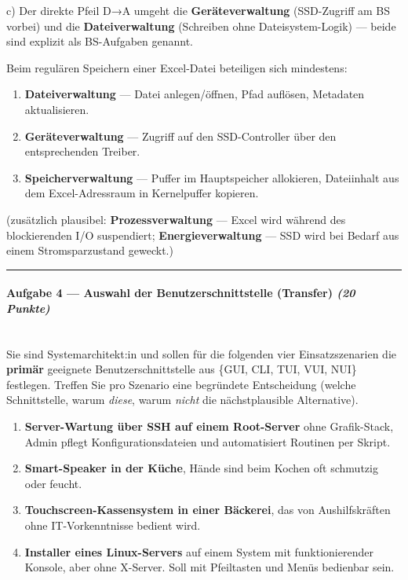 \documentclass[11pt, a4paper]{article}
\begin{document}
c) Der direkte Pfeil D→A umgeht die \textbf{Geräteverwaltung} (SSD-Zugriff am BS vorbei) und die \textbf{Dateiverwaltung} (Schreiben ohne Dateisystem-Logik) — beide sind explizit als BS-Aufgaben genannt.

Beim regulären Speichern einer Excel-Datei beteiligen sich mindestens:

\begin{enumerate}
  \item \textbf{Dateiverwaltung} — Datei anlegen/öffnen, Pfad auflösen, Metadaten aktualisieren.
  \item \textbf{Geräteverwaltung} — Zugriff auf den SSD-Controller über den entsprechenden Treiber.
  \item \textbf{Speicherverwaltung} — Puffer im Hauptspeicher allokieren, Dateiinhalt aus dem Excel-Adressraum in Kernelpuffer kopieren.
\end{enumerate}
(zusätzlich plausibel: \textbf{Prozessverwaltung} — Excel wird während des blockierenden I/O suspendiert; \textbf{Energieverwaltung} — SSD wird bei Bedarf aus einem Stromsparzustand geweckt.)



\noindent\textcolor{rulegray}{\rule{\linewidth}{0.4pt}}


\paragraph{Aufgabe 4 — Auswahl der Benutzerschnittstelle (Transfer) \textit{(20 Punkte)}}\mbox{}\\[2pt]

Sie sind Systemarchitekt:in und sollen für die folgenden vier Einsatzszenarien die \textbf{primär} geeignete Benutzerschnittstelle aus \{GUI, CLI, TUI, VUI, NUI\} festlegen. Treffen Sie pro Szenario eine begründete Entscheidung (welche Schnittstelle, warum \textit{diese}, warum \textit{nicht} die nächstplausible Alternative).


\begin{enumerate}
  \item \textbf{Server-Wartung über SSH auf einem Root-Server} ohne Grafik-Stack, Admin pflegt Konfigurationsdateien und automatisiert Routinen per Skript.
  \item \textbf{Smart-Speaker in der Küche}, Hände sind beim Kochen oft schmutzig oder feucht.
  \item \textbf{Touchscreen-Kassensystem in einer Bäckerei}, das von Aushilfskräften ohne IT-Vorkenntnisse bedient wird.
  \item \textbf{Installer eines Linux-Servers} auf einem System mit funktionierender Konsole, aber ohne X-Server. Soll mit Pfeiltasten und Menüs bedienbar sein.
\end{enumerate}
\end{document}
